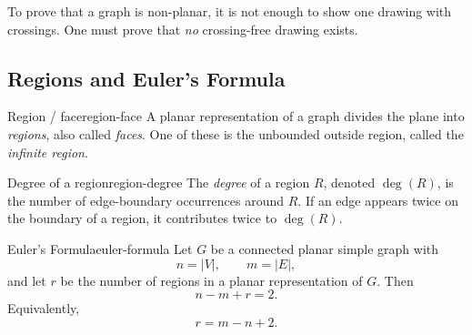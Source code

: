 \begin{commonmistake}[title={A non-planar-looking drawing is not a proof}]
To prove that a graph is non-planar, it is not enough to show one drawing with crossings. One must prove that \emph{no} crossing-free drawing exists.
\end{commonmistake}

\subsection{Regions and Euler's Formula}

\begin{definition}{Region / face}{region-face}
A planar representation of a graph divides the plane into \emph{regions}, also called \emph{faces}. One of these is the unbounded outside region, called the \emph{infinite region}.
\end{definition}

\begin{definition}{Degree of a region}{region-degree}
The \emph{degree} of a region \(R\), denoted \(\deg(R)\), is the number of edge-boundary occurrences around \(R\). If an edge appears twice on the boundary of a region, it contributes twice to \(\deg(R)\).
\end{definition}

\begin{center}
\end{center}

\begin{theorem}{Euler's Formula}{euler-formula}
Let \(G\) be a connected planar simple graph with
\[
n=|V|,\qquad m=|E|,
\]
and let \(r\) be the number of regions in a planar representation of \(G\). Then
\[
n-m+r=2.
\]
Equivalently,
\[
r=m-n+2.
\]
\end{theorem}


